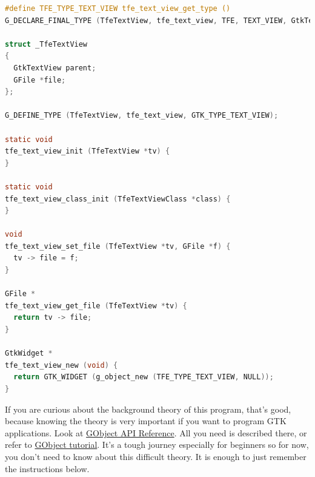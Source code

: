 \begin{lstlisting}[language=C]
#define TFE_TYPE_TEXT_VIEW tfe_text_view_get_type ()
G_DECLARE_FINAL_TYPE (TfeTextView, tfe_text_view, TFE, TEXT_VIEW, GtkTextView)

struct _TfeTextView
{
  GtkTextView parent;
  GFile *file;
};

G_DEFINE_TYPE (TfeTextView, tfe_text_view, GTK_TYPE_TEXT_VIEW);

static void
tfe_text_view_init (TfeTextView *tv) {
}

static void
tfe_text_view_class_init (TfeTextViewClass *class) {
}

void
tfe_text_view_set_file (TfeTextView *tv, GFile *f) {
  tv -> file = f;
}

GFile *
tfe_text_view_get_file (TfeTextView *tv) {
  return tv -> file;
}

GtkWidget *
tfe_text_view_new (void) {
  return GTK_WIDGET (g_object_new (TFE_TYPE_TEXT_VIEW, NULL));
}
\end{lstlisting}

If you are curious about the background theory of this program, that's
good, because knowing the theory is very important if you want to
program GTK applications. Look at
\href{https://docs.gtk.org/gobject/}{GObject API Reference}. All you
need is described there, or refer to
\href{https://github.com/ToshioCP/Gobject-tutorial}{GObject tutorial}.
It's a tough journey especially for beginners so for now, you don't need
to know about this difficult theory. It is enough to just remember the
instructions below.

